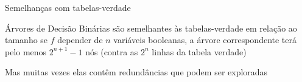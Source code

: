 \expandafter\documentclass\expandafter[table, usenames, svgnames, dvipsnames,14pt, \classopts]{beamer}
\begin{document}
\begin{frame}{Semelhanças com tabelas-verdade}

    \begin{outline}
        \1 Árvores de Decisão Binárias são semelhantes às tabelas-verdade em relação ao tamanho
            \2[-] se $f$ depender de $n$ variáveis booleanas, a árvore correspondente terá pelo menos $2^{n+1}-1$ nós (contra as $2^n$ linhas da tabela verdade)
        
        \vspace{1em}
        
        \1 Mas muitas vezes elas contêm redundâncias que podem ser exploradas
    \end{outline}      
   
\end{frame}
\end{document}
